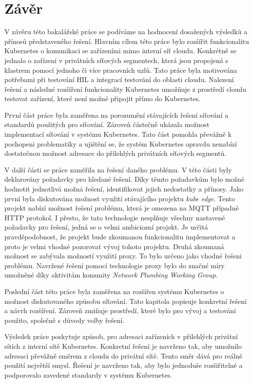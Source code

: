 \chapter{Závěr}
V závěru této bakalářské práce se podíváme na hodnocení dosažených výsledků a přínosů představeného řešení. Hlavním cílem této práce bylo rozšířit funkcionalitu Kubernetes o komunikaci se zařízeními mimo interní síť cloudu. Konkrétně se jednalo o zařízení v privátních síťových segmentech, která jsou propojená s klastrem pomocí jednoho či více pracovních uzlů. Tato práce byla motivována potřebami při testování HIL a integrací testování do oblasti cloudu. Nalezení řešení a následné rozšíření funkcionality Kubernetes umožňuje z prostředí cloudu testovat zařízení, které není možné připojit přímo do Kubernetes.    

První část práce byla zaměřena na porozumění stávajících řešení síťování a standardů použitých pro síťování. Zároveň částečně ukázala možnost implementací síťování v systému Kubernetes. Tato část pomohla převážně k pochopeni problematiky a ujištění se, že systém Kubernetes opravdu nenabízí dostatečnou možnost adresace do přilehlých privátních síťových segmentů.

V další části se práce zaměřila na řešení daného problému. V této části byly deklarovány požadavky pro hledané řešení. Díky těmto požadavkům bylo možné hodnotit jednotlivá možná řešení, identifikovat jejich nedostatky a přínosy. Jako první byla diskutována možnost využití stávajícího projektu \textit{kube edge}. Tento projekt nabízí možnost řešení problému, která je omezena na MQTT případně HTTP protokol. I přesto, že tato technologie nesplňuje všechny nastavené požadavky pro řešení, jedná se o velmi ambiciozní projekt. Je určitá pravděpodobnost, že projekt bude zkoumanou funkcionalitu implementovat a proto je velmi vhodné pozorovat vývoj tohoto projektu. Druhá zkoumaná možnost se zabývala možností využití proxy. To bylo určeno jako vhodné řešeni problému. Navržené řešení pomocí technologie proxy bylo do značné míry umožněné díky aktivitám komunity \textit{Network Plumbing Working Group}.

Poslední část této práce byla zaměřena na rozšířen systému Kubernetes o možnost diskutovaného způsobu síťování. Tato kapitola popisuje konkretní řešení a návrh rozšíření. Zároveň zmiňuje prostředí, které bylo pro vývoj a testováni použito, společně s důvody volby řešení.

Výsledek práce poskytuje způsob, pro adresaci zařízeních v přilehlých privátní sítích z interní sítě Kubernetes. Konkretní řešení je navrženo tak, aby umožnilo adresaci převážně směrem z cloudu do privátní sítě. Tento směr dává pro reálně použití největší smysl. Řešení je navrženo tak, aby bylo jednoduše rozšiřitelné a podporovalo zavedené standardy v systému Kubernetes.

